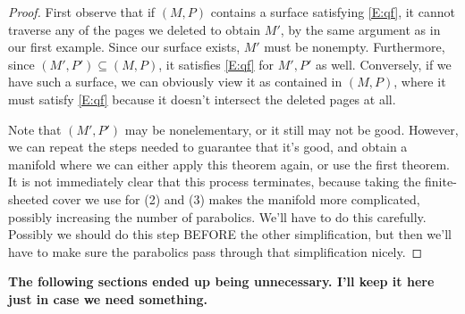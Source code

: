 \documentclass[12pt]{amsart}
\theoremstyle{definition}
\theoremstyle{remark}
\newcommand{\cin}{\subseteq}
\begin{document}
\begin{proof}

First observe that if $(M,P)$ contains a surface satisfying \eqref{E:qf}, it cannot
traverse any of the pages we deleted to obtain $M'$, by the same argument as in
our first example.  Since our surface exists, $M'$ must be nonempty.
Furthermore, since $(M',P') \cin (M,P)$, it satisfies \eqref{E:qf} for $M',P'$ as well.
Conversely, if we have such a surface, we can obviously view it as contained in
$(M,P)$, where it must satisfy \eqref{E:qf} because it doesn't intersect the deleted
pages at all.

Note that $(M',P')$ may be nonelementary, or it still may not be good.
However, we can repeat the steps needed to guarantee that it's good, and obtain
a manifold where we can either apply this theorem again, or use the first
theorem. It is not immediately clear that this process terminates, because
taking the finite-sheeted cover we use for (2) and (3) makes the manifold more
complicated, possibly increasing the number of parabolics. We'll have to do
this carefully. Possibly we should do this step BEFORE the other
simplification, but then we'll have to make sure the parabolics pass through
that simplification nicely.

\end{proof}

\textbf{ The following sections ended up being unnecessary. I'll keep it here just
in case we need something. }
\end{document}
